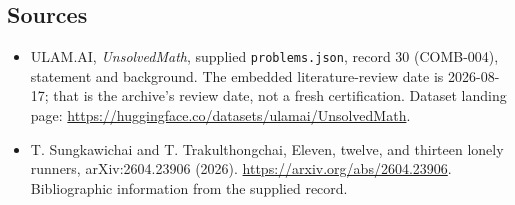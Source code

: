 \documentclass[11pt,a4paper]{article}
\begin{document}
\subsection{Sources}

{\small

\begin{itemize}

\item[\hypertarget{source:30:1}{S1}] ULAM.AI, \emph{UnsolvedMath}, supplied \texttt{problems.json}, record 30 (COMB-004), statement and background. The embedded literature-review date is 2026-08-17; that is the archive’s review date, not a fresh certification. Dataset landing page: \url{https://huggingface.co/datasets/ulamai/UnsolvedMath}.

\item[\hypertarget{source:30:2}{S2}] T. Sungkawichai and T. Trakulthongchai, Eleven, twelve, and thirteen lonely runners, arXiv:2604.23906 (2026). \url{https://arxiv.org/abs/2604.23906}. Bibliographic information from the supplied record.

\end{itemize}

}

\label{end:30}
\end{document}
